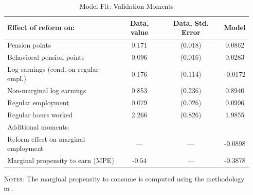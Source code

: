 \begin{table}[htbp]\centering\begin{threeparttable}\caption{Model Fit: Validation Moments}\label{table:nontargeted_moments}\footnotesize\begin{tabular}{lccc}\toprule Effect of reform on: & Data, value & Data, Std. Error & Model \\\midrule Pension points & 0.171 & (0.018) & 0.0862\\Behavioral pension points & 0.096 & (0.016) & 0.0283\\Log earnings (cond. on regular empl.) & 0.176 & (0.114) & -0.0172\\Non-marginal log earnings  & 0.853 & (0.236) & 0.8940\\Regular employment & 0.079 & (0.026) & 0.0996\\Regular hours worked & 2.266 & (0.826) & 1.9855\\\midrule \multicolumn{4}{l}{Additional moments:} \\\midrule Reform effect on marginal employment  & --- & --- & -0.0898\\Marginal propensity to earn (MPE) & -$0.54$ & --- & -0.3878\\\bottomrule \end{tabular}\begin{tablenotes}[flushleft]\small\item \textsc{Notes:} The marginal propensity to consume is computed using the methodology in \cite{golosov2024}.\\\end{tablenotes}\end{threeparttable}\end{table}
